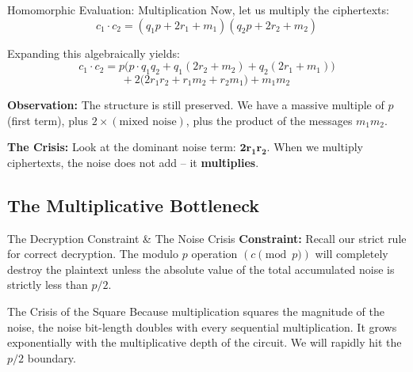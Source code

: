 \documentclass[10pt,handout]{beamer}
\begin{document}
\begin{frame}{Homomorphic Evaluation: Multiplication}
    Now, let us multiply the ciphertexts:
    $$c_1 \cdot c_2 = (q_1 p + 2r_1 + m_1)(q_2 p + 2r_2 + m_2)$$
    \pause
    
    Expanding this algebraically yields:
    $$c_1 \cdot c_2 = p \big( p \cdot q_1 q_2 + q_1(2r_2 + m_2) + q_2(2r_1 + m_1) \big)$$
    $$+ \ 2 \big( 2r_1 r_2 + r_1 m_2 + r_2 m_1 \big) + m_1 m_2$$
    \pause
    
    \vspace{0.3cm}
    \textbf{Observation:}
    The structure is still preserved. We have a massive multiple of $p$ (first term), plus $2 \times (\text{mixed noise})$, plus the product of the messages $m_1 m_2$.
    
    \vspace{0.2cm}
    \textbf{The Crisis:} Look at the dominant noise term: $\mathbf{2r_1 r_2}$. When we multiply ciphertexts, the noise does not add -- it \textbf{multiplies}.
\end{frame}

\subsection{The Multiplicative Bottleneck}

\begin{frame}{The Decryption Constraint \& The Noise Crisis}
    \textbf{Constraint:} 
    Recall our strict rule for correct decryption. The modulo $p$ operation $(c \pmod p)$ will completely destroy the plaintext unless the absolute value of the total accumulated noise is strictly less than $p/2$.
    \pause
    
    \vspace{0.3cm}
    \begin{block}{The Crisis of the Square}
    Because multiplication squares the magnitude of the noise, the noise bit-length doubles with every sequential multiplication. It grows exponentially with the multiplicative depth of the circuit. We will rapidly hit the $p/2$ boundary.
    \end{block}
\end{frame}
\end{document}
